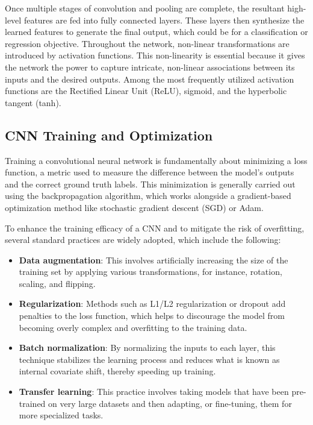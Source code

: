 \documentclass[12pt,a4paper]{article}
\begin{document}
Once multiple stages of convolution and pooling are complete, the resultant high-level features are fed into fully connected layers. These layers then synthesize the learned features to generate the final output, which could be for a classification or regression objective. Throughout the network, non-linear transformations are introduced by activation functions. This non-linearity is essential because it gives the network the power to capture intricate, non-linear associations between its inputs and the desired outputs. Among the most frequently utilized activation functions are the Rectified Linear Unit (ReLU), sigmoid, and the hyperbolic tangent (tanh).

\subsection{CNN Training and Optimization}
Training a convolutional neural network is fundamentally about minimizing a loss function, a metric used to measure the difference between the model's outputs and the correct ground truth labels. This minimization is generally carried out using the backpropagation algorithm, which works alongside a gradient-based optimization method like stochastic gradient descent (SGD) or Adam.

To enhance the training efficacy of a CNN and to mitigate the risk of overfitting, several standard practices are widely adopted, which include the following:
\begin{itemize}
\item \textbf{Data augmentation}: This involves artificially increasing the size of the training set by applying various transformations, for instance, rotation, scaling, and flipping.
\item \textbf{Regularization}: Methods such as L1/L2 regularization or dropout add penalties to the loss function, which helps to discourage the model from becoming overly complex and overfitting to the training data.
\item \textbf{Batch normalization}: By normalizing the inputs to each layer, this technique stabilizes the learning process and reduces what is known as internal covariate shift, thereby speeding up training.
\item \textbf{Transfer learning}: This practice involves taking models that have been pre-trained on very large datasets and then adapting, or fine-tuning, them for more specialized tasks.
\end{itemize}
\end{document}
